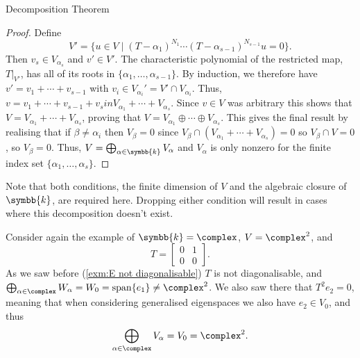 \documentclass[fleqn]{NotesClass}
\renewcommand{\field}{\symbb{k}}
\DeclareMathOperator{\Span}{span}
\begin{document}
\begin{thm}{Decomposition Theorem}{}
\begin{proof}
            Define
            \begin{equation}
                V' = \{u \in V \mid (T - \alpha_1)^{N_1} \dotsm (T - \alpha_{s-1})^{N_{s-1}}u = 0\}.
            \end{equation}
            Then \(v_s \in V_{\alpha_s}\) and \(v' \in V'\).
            The characteristic polynomial of the restricted map, \(T|_{V'}\), has all of its roots in \(\{\alpha_1, \dotsc, \alpha_{s-1}\}\).
            By induction, we therefore have \(v' = v_1 + \dotsb + v_{s-1}\) with \(v_i \in V_{\alpha_i}' = V' \cap V_{\alpha_i}\).
            Thus, \(v = v_1 + \dotsb + v_{s-1} + v_s in V_{\alpha_1} + \dotsb + V_{\alpha_s}\).
            Since \(v \in V\) was arbitrary this shows that \(V = V_{\alpha_1} + \dotsb + V_{\alpha_s}\), proving that \(V = V_{\alpha_1} \oplus \dotsb \oplus V_{\alpha_s}\).
            This gives the final result by realising that if \(\beta \ne \alpha_i\) then \(V_\beta = 0\) since \(V_\beta \cap (V_{\alpha_1} + \dotsb + V_{\alpha_s}) = 0\) so \(V_\beta \cap V = 0\), so \(V_\beta = 0\).
            Thus, \(V = \bigoplus_{\alpha \in \field} V_{\alpha}\) and \(V_{\alpha}\) is only nonzero for the finite index set \(\{\alpha_1, \dotsc, \alpha_s\}\).
        \end{proof}
    \end{thm}
    
    Note that both conditions, the finite dimension of \(V\) and the algebraic closure of \(\field\), are required here.
    Dropping either condition will result in cases where this decomposition doesn't exist.
    
    \begin{exm}{}{}
        Consider again the example of \(\field = \complex\), \(V = \complex^2\), and
        \begin{equation}
            T = 
            \begin{bmatrix}
                0 & 1\\
                0 & 0
            \end{bmatrix}
            .
        \end{equation}
        As we saw before (\cref{exm:E not diagonalisable}) \(T\) is not diagonalisable, and \(\bigoplus_{\alpha \in \complex} W_\alpha = W_0 = \Span\{e_1\} \ne \complex^2\).
        We also saw there that \(T^2e_2 = 0\), meaning that when considering generalised eigenspaces we also have \(e_2 \in V_0\), and thus
        \begin{equation}
            \bigoplus_{\alpha \in \complex} V_\alpha = V_0 = \complex^2.
        \end{equation}
    \end{exm}
    
\end{document}
